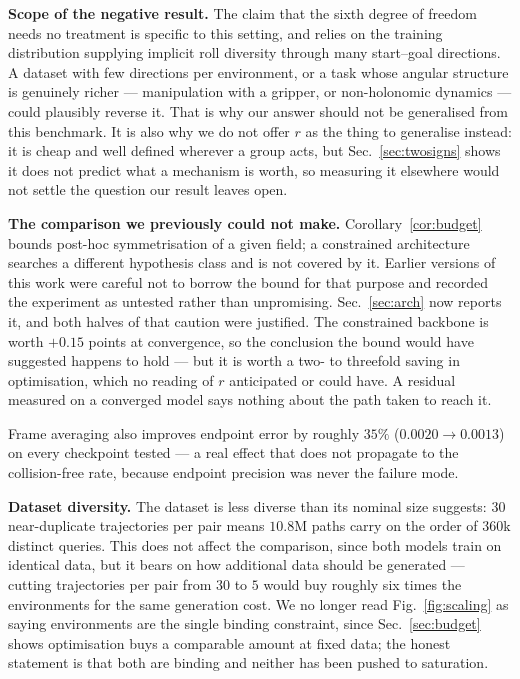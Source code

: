 \documentclass[10pt,twocolumn,letterpaper]{article}
\theoremstyle{plain}
\begin{document}
\textbf{Scope of the negative result.} The claim that the sixth degree of freedom
needs no treatment is specific to this setting, and relies on the training
distribution supplying implicit roll diversity through many start--goal directions.
A dataset with few directions per environment, or a task whose angular structure is
genuinely richer --- manipulation with a gripper, or non-holonomic dynamics --- could
plausibly reverse it. That is why our answer should not be generalised from this benchmark. It is also
why we do not offer $r$ as the thing to generalise instead: it is cheap and well
defined wherever a group acts, but Sec.~\ref{sec:twosigns} shows it does not
predict what a mechanism is worth, so measuring it elsewhere would not settle the
question our result leaves open.

\textbf{The comparison we previously could not make.} Corollary~\ref{cor:budget}
bounds post-hoc symmetrisation of a given field; a constrained architecture
searches a different hypothesis class and is not covered by it. Earlier versions
of this work were careful not to borrow the bound for that purpose and recorded
the experiment as untested rather than unpromising. Sec.~\ref{sec:arch} now
reports it, and both halves of that caution were justified. The constrained
backbone is worth $+0.15$ points at convergence, so the conclusion the bound
would have suggested happens to hold --- but it is worth a two- to threefold
saving in optimisation, which no reading of $r$ anticipated or could have. A
residual measured on a converged model says nothing about the path taken to
reach it.

Frame averaging also improves endpoint error by roughly $35\%$
($0.0020\!\to\!0.0013$) on every checkpoint tested --- a real effect that does not
propagate to the collision-free rate, because endpoint precision was never the
failure mode.

\textbf{Dataset diversity.} The dataset is less diverse than its nominal size
suggests: $30$ near-duplicate trajectories per pair means $10.8$M paths carry on
the order of $360$k distinct queries. This does not affect the comparison, since
both models train on identical data, but it bears on how additional data should be
generated --- cutting trajectories per pair from $30$ to $5$ would buy roughly six
times the environments for the same generation cost. We no longer read
Fig.~\ref{fig:scaling} as saying environments are the single binding constraint,
since Sec.~\ref{sec:budget} shows optimisation buys a comparable amount at fixed
data; the honest statement is that both are binding and neither has been pushed
to saturation.
\end{document}
